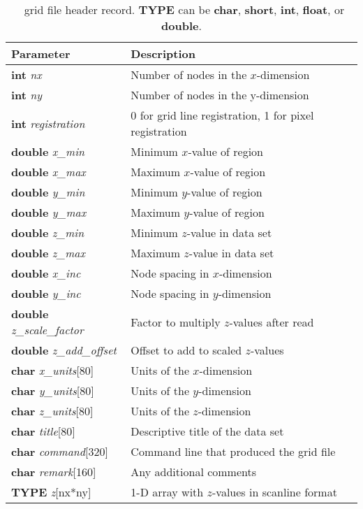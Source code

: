 \begin{table}
\centering
\begin{tabular}{ll} \hline
\textbf{Parameter}} & \textbf{Description}} \\ \hline\hline
\textbf{int} \emph{nx} & Number of nodes in the $x$-dimension \\
\textbf{int} \emph{ny} & Number of nodes in the y-dimension \\
\textbf{int} \emph{registration} & 0 for grid line registration, 1 for pixel registration \\
\textbf{double} \emph{x\_min} & Minimum $x$-value of region \\
\textbf{double} \emph{x\_max} & Maximum $x$-value of region \\
\textbf{double} \emph{y\_min} & Minimum $y$-value of region \\
\textbf{double} \emph{y\_max} & Maximum $y$-value of region \\
\textbf{double} \emph{z\_min} & Minimum $z$-value in data set \\
\textbf{double} \emph{z\_max} & Maximum $z$-value in data set \\
\textbf{double} \emph{x\_inc} & Node spacing in $x$-dimension \\
\textbf{double} \emph{y\_inc} & Node spacing in $y$-dimension \\
\textbf{double} \emph{z\_scale\_factor} & Factor to multiply $z$-values after read \\
\textbf{double} \emph{z\_add\_offset} & Offset to add to scaled $z$-values \\
\textbf{char} \emph{x\_units}[80] & Units of the $x$-dimension \\
\textbf{char} \emph{y\_units}[80] & Units of the $y$-dimension \\
\textbf{char} \emph{z\_units}[80] & Units of the $z$-dimension \\
\textbf{char} \emph{title}[80] & Descriptive title of the data set \\
\textbf{char} \emph{command}[320] & Command line that produced the grid file \\
\textbf{char} \emph{remark}[160] & Any additional comments \\
\textbf{TYPE} \emph{z}[nx*ny] & 1-D array with $z$-values in scanline format \\ \hline
\end{tabular}
\caption{\gmt\ grid file header record. \textbf{TYPE} can be \textbf{char}, \textbf{short}, \textbf{int},
\textbf{float}, or {\bf
double}.}
\label{tbl:grdheader}
\end{table}

